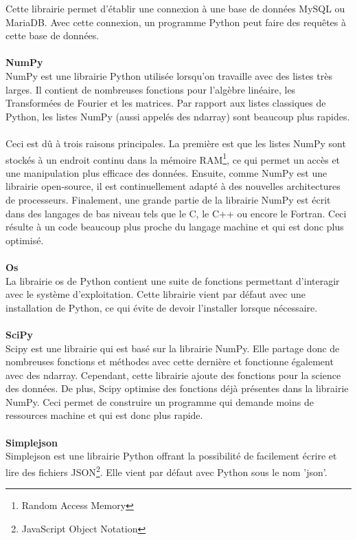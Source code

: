\documentclass[11pt]{article}
\begin{document}
Cette librairie permet d'établir une connexion à une base de données MySQL ou MariaDB.
Avec cette connexion, un programme Python peut faire des requêtes à cette base de données.\\
\\
\textbf{NumPy}\\
NumPy est une librairie Python utilisée lorsqu'on travaille avec des listes très larges.
Il contient de nombreuses fonctions pour l'algèbre linéaire, les Transformées de Fourier et les matrices.
Par rapport aux listes classiques de Python, les listes NumPy (aussi appelés des ndarray) sont beaucoup plus rapides.\\
\\
Ceci est dû à trois raisons principales.
La première est que les listes NumPy sont stockés à un endroit continu dans la mémoire RAM\footnote{Random Access Memory}, ce qui permet un accès et une manipulation plus efficace des données.
Ensuite, comme NumPy est une librairie open-source, il est continuellement adapté à des nouvelles architectures de processeurs.
Finalement, une grande partie de la librairie NumPy est écrit dans des langages de bas niveau tels que le C, le C++ ou encore le Fortran.
Ceci résulte à un code beaucoup plus proche du langage machine et qui est donc plus optimisé.\\
\\
\textbf{Os}\\
La librairie os de Python contient une suite de fonctions permettant d'interagir avec le système d'exploitation.
Cette librairie vient par défaut avec une installation de Python, ce qui évite de devoir l'installer lorsque nécessaire.\\
\\
\textbf{SciPy}\\
Scipy est une librairie qui est basé sur la librairie NumPy.
Elle partage donc de nombreuses fonctions et méthodes avec cette dernière et fonctionne également avec des ndarray.
Cependant, cette librairie ajoute des fonctions pour la science des données.
De plus, Scipy optimise des fonctions déjà présentes dans la librairie NumPy.
Ceci permet de construire un programme qui demande moins de ressources machine et qui est donc plus rapide.\\
\\
\textbf{Simplejson}\\
Simplejson est une librairie Python offrant la possibilité de facilement écrire et lire des fichiers JSON\footnote{JavaScript Object Notation}.
Elle vient par défaut avec Python sous le nom 'json'.
\end{document}

